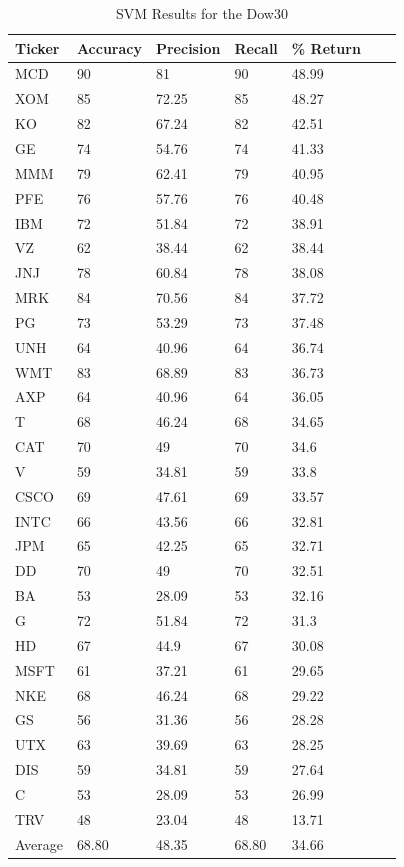 \documentclass{article}
\begin{document}
\begin{table}[h]
  \begin{tabular}{@{}lllllll@{}}
    \toprule
    Ticker & Accuracy & Precision & Recall & \% Return & \\ \midrule
    MCD & 90 & 81 & 90 & 48.99 & \\
    XOM & 85 & 72.25 & 85 & 48.27 & \\
    KO & 82 & 67.24 & 82 & 42.51 & \\
    GE & 74 & 54.76 & 74 & 41.33 & \\
    MMM & 79 & 62.41 & 79 & 40.95 & \\
    PFE & 76 & 57.76 & 76 & 40.48 & \\
    IBM & 72 & 51.84 & 72 & 38.91 & \\
    VZ & 62 & 38.44 & 62 & 38.44 & \\
    JNJ & 78 & 60.84 & 78 & 38.08 & \\
    MRK & 84 & 70.56 & 84 & 37.72 & \\
    PG & 73 & 53.29 & 73 & 37.48 & \\
    UNH & 64 & 40.96 & 64 & 36.74 & \\
    WMT & 83 & 68.89 & 83 & 36.73 & \\
    AXP & 64 & 40.96 & 64 & 36.05 & \\
    T & 68 & 46.24 & 68 & 34.65 & \\
    CAT & 70 & 49 & 70 & 34.6 & \\
    V & 59 & 34.81 & 59 & 33.8 & \\
    CSCO & 69 & 47.61 & 69 & 33.57 & \\
    INTC & 66 & 43.56 & 66 & 32.81 & \\
    JPM & 65 & 42.25 & 65 & 32.71 & \\
    DD & 70 & 49 & 70 & 32.51 & \\
    BA & 53 & 28.09 & 53 & 32.16 & \\
    G & 72 & 51.84 & 72 & 31.3 & \\
    HD & 67 & 44.9 & 67 & 30.08 & \\
    MSFT & 61 & 37.21 & 61 & 29.65 & \\
    NKE & 68 & 46.24 & 68 & 29.22 & \\
    GS & 56 & 31.36 & 56 & 28.28 & \\
    UTX & 63 & 39.69 & 63 & 28.25 & \\
    DIS & 59 & 34.81 & 59 & 27.64 & \\
    C & 53 & 28.09 & 53 & 26.99 & \\
    TRV & 48 & 23.04 & 48 & 13.71 & \\ \bottomrule
    Average & 68.80 & 48.35 & 68.80 & 34.66 & \\
  \end{tabular}
  \caption{SVM Results for the Dow30}
  \label{my-label}
\end{table}
\end{document}

